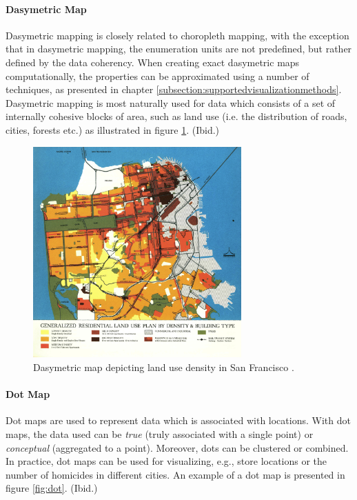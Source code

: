 \paragraph{Dasymetric Map}

Dasymetric mapping is closely related to choropleth mapping, with the exception that in dasymetric mapping, the enumeration units are not predefined, but rather defined by the data coherency. When creating exact dasymetric maps computationally, the properties can be approximated using a number of techniques, as presented in chapter \ref{subsection:supportedvisualizationmethods}. Dasymetric mapping is most naturally used for data which consists of a set of internally cohesive blocks of area, such as land use (i.e. the distribution of roads, cities, forests etc.) as illustrated in figure \ref{fig:dasymetric}. (Ibid.)

\begin{figure}[htbp]
  \begin{center}
    \includegraphics[width=8cm]{images/dasymetric-example.jpg}
    \caption{Dasymetric map depicting land use density in San Francisco \citep{fischer_generalized_2012}.}
    \label{fig:dasymetric}
  \end{center}
\end{figure}

\paragraph{Dot Map}

Dot maps are used to represent data which is associated with locations. With dot maps, the data used can be \emph{true} (truly associated with a single point) or \emph{conceptual} (aggregated to a point). Moreover, dots can be clustered or combined. In practice, dot maps can be used for visualizing, e.g., store locations or the number of homicides in different cities. An example of a dot map is presented in figure \ref{fig:dot}. (Ibid.)

